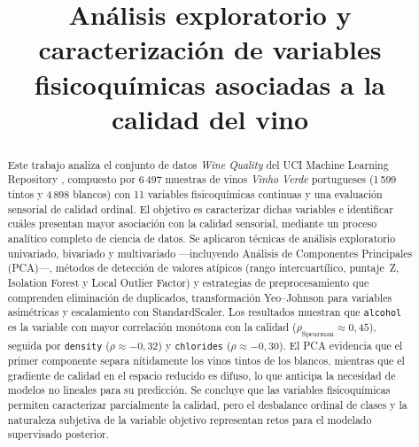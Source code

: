 \documentclass[conference]{IEEEtran}
\begin{document}
\title{Análisis exploratorio y caracterización de variables fisicoquímicas
       asociadas a la calidad del vino}

\author{
    \and
}

\maketitle

\begin{abstract}
Este trabajo analiza el conjunto de datos \textit{Wine Quality} del UCI Machine
Learning Repository \cite{uci_repo}, compuesto por 6\,497 muestras de vinos
\textit{Vinho Verde} portugueses (1\,599 tintos y 4\,898 blancos) con 11
variables fisicoquímicas continuas y una evaluación sensorial de calidad
ordinal. El objetivo es caracterizar dichas variables e identificar cuáles
presentan mayor asociación con la calidad sensorial, mediante un proceso
analítico completo de ciencia de datos. Se aplicaron técnicas de análisis
exploratorio univariado, bivariado y multivariado ---incluyendo Análisis de
Componentes Principales (PCA)---, métodos de detección de valores atípicos
(rango intercuartílico, puntaje~Z, Isolation Forest y Local Outlier Factor) y
estrategias de preprocesamiento que comprenden eliminación de duplicados,
transformación Yeo--Johnson para variables asimétricas y escalamiento con
StandardScaler. Los resultados muestran que \texttt{alcohol} es la variable con
mayor correlación monótona con la calidad ($\rho_{\text{Spearman}} \approx 0{,}45$),
seguida por \texttt{density} ($\rho \approx -0{,}32$) y \texttt{chlorides}
($\rho \approx -0{,}30$). El PCA evidencia que el primer componente separa
nítidamente los vinos tintos de los blancos, mientras que el gradiente de
calidad en el espacio reducido es difuso, lo que anticipa la necesidad de
modelos no lineales para su predicción. Se concluye que las variables
fisicoquímicas permiten caracterizar parcialmente la calidad, pero el
desbalance ordinal de clases y la naturaleza subjetiva de la variable objetivo
representan retos para el modelado supervisado posterior.
\end{abstract}
\end{document}
